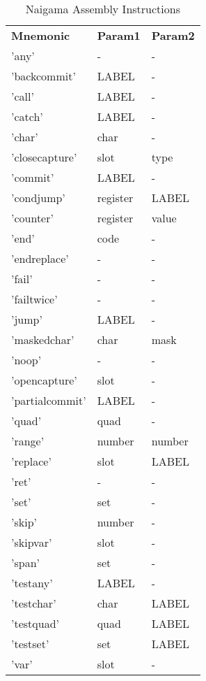 
\begin{table}[]
\centering
\caption{Naigama Assembly Instructions}
\label{tab:naig_assembly}
\begin{tabular}{lll}
\textbf{Mnemonic} & \textbf{Param1} & \textbf{Param2} \\
'any' & - & - \\
'backcommit' & LABEL & - \\
'call' & LABEL & - \\
'catch' & LABEL & - \\
'char' & char & - \\
'closecapture' & slot & type \\
'commit' & LABEL & - \\
'condjump' & register & LABEL \\
'counter' & register & value \\
'end' & code & - \\
'endreplace' & - & - \\
'fail' & - & - \\
'failtwice' & - & - \\
'jump' & LABEL & - \\
'maskedchar' & char & mask \\
'noop' & - & - \\
'opencapture' & slot & - \\
'partialcommit' & LABEL & - \\
'quad' & quad & - \\
'range' & number & number \\
'replace' & slot & LABEL \\
'ret' & - & - \\
'set' & set & - \\
'skip' & number & - \\
'skipvar' & slot & - \\
'span' & set & - \\
'testany' & LABEL & - \\
'testchar' & char & LABEL \\
'testquad' & quad & LABEL \\
'testset' & set & LABEL \\
'var' & slot & - \\
\end{tabular}
\end{table}
